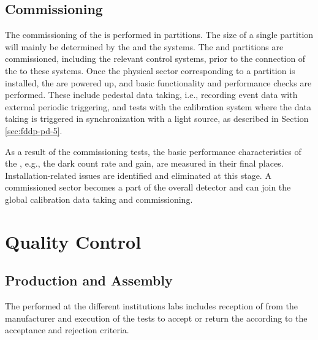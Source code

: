 \subsection{Commissioning}
\label{sec:fddp-pd-9.4}

The commissioning of the  is performed in partitions. The size of a single partition will mainly be determined by the  and the  systems. The  and  partitions are commissioned, including the relevant control systems, prior to the connection of the  to these systems. Once the physical sector corresponding to a partition is installed, the  are powered up, and basic functionality and performance checks are performed. These include pedestal data taking, i.e., recording event data with external periodic triggering, and tests with the calibration system where the data taking is triggered in synchronization with a light source, as described in Section \ref{sec:fddp-pd-5}.

As a result of the commissioning tests, the basic performance characteristics of the , e.g., the dark count rate and gain, are measured in their final places. Installation-related issues are identified and eliminated at this stage. A commissioned sector %
becomes a part of the overall detector and can join the global calibration data taking and commissioning.

\section{Quality Control}
\label{sec:fddp-pd-10}


 \subsection{Production and Assembly}
 \label{sec:fddp-pd-10.1}
 
The  performed at the different institutions labs includes reception of  from the manufacturer and execution of the  tests to accept or return the  according to the acceptance and rejection criteria.

